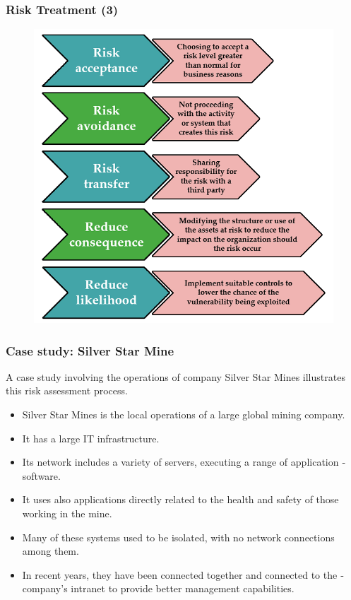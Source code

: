 \documentclass[xcolor ={table,usenames,dvipsnames}]{beamer}
\theoremstyle{definition}
\begin{document}
	\begin{frame}
		\frametitle{Risk Treatment (3)}
		\begin{figure}[h!]
			\centering
			\includegraphics[scale=0.25]{img/img_14.PNG}
			\label{Interfacce di un CS}
		\end{figure}
	\end{frame}

	\begin{frame}
		\frametitle{Case study: Silver Star Mine}
		A case study involving the operations of  company Silver Star Mines illustrates this risk assessment process. 
		\begin{itemize}
			\item Silver Star Mines is the local operations of a large global
			mining company. 
			\item It has a large IT infrastructure.
			\item Its network includes a variety of servers, executing a range of ­application ­software. 
			\item It uses also applications directly related to the health and safety of those working in the mine.
			\item Many of these systems used to be isolated, with no network connections among them.
			\item In recent years, they have been connected together and connected to the ­company’s
			intranet to provide better management capabilities. 
		\end{itemize}
	\end{frame}
\end{document}
